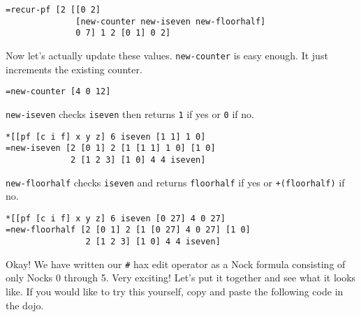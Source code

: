 \documentclass[twoside]{article}
\begin{document}
\begin{lstlisting}[style=listingblock]
=recur-pf [2 [[0 2]
              [new-counter new-iseven new-floorhalf]
              0 7] 1 2 [0 1] 0 2]
\end{lstlisting}

\noindent
Now let's actually update these values. \lstinline[style=inlinecode]{new-counter} is easy enough. It just increments the existing counter.

\begin{lstlisting}[style=listingblock]
=new-counter [4 0 12]
\end{lstlisting}

\noindent
\lstinline[style=inlinecode]{new-iseven} checks \lstinline[style=inlinecode]{iseven} then returns \lstinline[style=inlinecode]{1} if yes or \lstinline[style=inlinecode]{0} if no.

\begin{lstlisting}[style=listingblock]
*[[pf [c i f] x y z] 6 iseven [1 1] 1 0]
=new-iseven [2 [0 1] 2 [1 [1 1] 1 0] [1 0]
             2 [1 2 3] [1 0] 4 4 iseven]
\end{lstlisting}

\noindent
\lstinline[style=inlinecode]{new-floorhalf} checks \lstinline[style=inlinecode]{iseven} and returns \lstinline[style=inlinecode]{floorhalf} if yes or \lstinline[style=inlinecode]{+(floorhalf)} if no.

\begin{lstlisting}[style=listingblock]
*[[pf [c i f] x y z] 6 iseven [0 27] 4 0 27]
=new-floorhalf [2 [0 1] 2 [1 [0 27] 4 0 27] [1 0]
                2 [1 2 3] [1 0] 4 4 iseven]
\end{lstlisting}

\noindent
Okay! We have written our \lstinline[style=inlinecode]{#} hax edit operator as a Nock formula consisting of only Nocks 0 through 5. Very exciting! Let's put it together and see what it looks like. If you would like to try this yourself, copy and paste the following code in the dojo.
\end{document}
